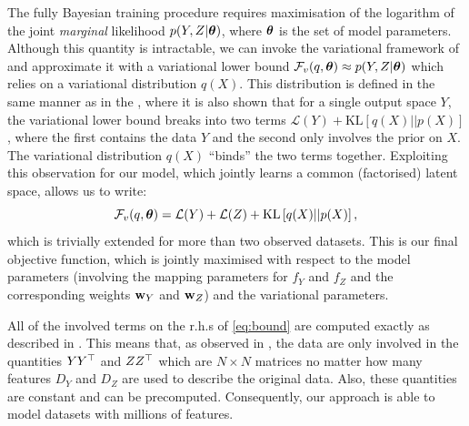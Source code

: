 
\par The fully Bayesian training procedure requires maximisation of
the logarithm of the joint
\emph{marginal} likelihood $p(Y,Z | \boldsymbol \theta)$, where $\boldsymbol \theta$ is the set of model parameters.
Although this quantity is intractable, we can invoke the variational framework of 
\cite{Titsias:bayesGPLVM10,Damianou:vgpds11} and
approximate it with a variational lower bound $\mathcal{F}_v(q,\boldsymbol \theta) \approx p(Y,Z | \boldsymbol \theta)$
 which relies on a variational
distribution $q(X)$. This distribution is defined in the same manner as in the \cite{Titsias:bayesGPLVM10,Damianou:vgpds11},
where it is also shown that for a single output space $Y$, the variational lower bound
breaks into two terms 
$\mathcal{L}(Y) + \text{KL}\left[ q(X) || p(X) \right]$, where the first contains
the data $Y$ and the second only involves the prior on $X$. The variational distribution $q(X)$
``binds'' the two terms together. Exploiting this observation for our model, which jointly learns
a common (factorised) latent space, allows us to write:
\begin{equation}
\mathcal{F}_v(q,\boldsymbol \theta) = \mathcal{L}(Y) + \mathcal{L}(Z) + \text{KL} \left[ q(X) || p(X) \right],
\label{eq:bound}
\end{equation}
which is trivially extended for more than two observed datasets. This is
our final objective function, which is jointly maximised with respect to the model parameters (involving
the mapping parameters for $f_Y$ and $f_Z$ and the corresponding weights $\mathbf{w}_Y$ and $\mathbf{w}_Z$) and
the variational parameters.

All of the involved terms on the r.h.s of \eqref{eq:bound} are computed exactly as described in \cite{Titsias:bayesGPLVM10,Damianou:vgpds11}.
This means that, as observed in \cite{Damianou:vgpds11}, the data are only involved
in the quantities $Y Y^{\top}$ and $Z Z^{\top}$ which are $N \times N$ matrices no matter how many features
$D_Y$ and $D_Z$ are used to describe the original data. Also, these quantities are constant and can
be precomputed. Consequently, our approach is able to model datasets with millions of features.

